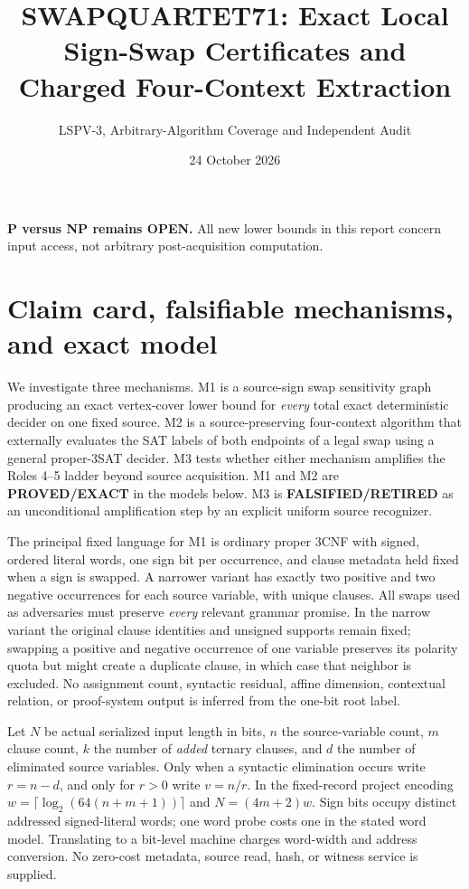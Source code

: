\documentclass[11pt]{article}
\title{SWAPQUARTET71: Exact Local Sign-Swap Certificates and Charged Four-Context Extraction}
\author{LSPV-3, Arbitrary-Algorithm Coverage and Independent Audit}
\date{24 October 2026}
\begin{document}
\maketitle
\begin{center}\textbf{P versus NP remains OPEN.} All new lower bounds in this report concern input access, not arbitrary post-acquisition computation.\end{center}

\section{Claim card, falsifiable mechanisms, and exact model}
We investigate three mechanisms. M1 is a source-sign swap sensitivity graph producing an exact vertex-cover lower bound for \emph{every} total exact deterministic decider on one fixed source. M2 is a source-preserving four-context algorithm that externally evaluates the SAT labels of both endpoints of a legal swap using a general proper-3SAT decider. M3 tests whether either mechanism amplifies the Roles 4--5 ladder beyond source acquisition. M1 and M2 are \textbf{PROVED/EXACT} in the models below. M3 is \textbf{FALSIFIED/RETIRED} as an unconditional amplification step by an explicit uniform source recognizer.

The principal fixed language for M1 is ordinary proper 3CNF with signed, ordered literal words, one sign bit per occurrence, and clause metadata held fixed when a sign is swapped. A narrower variant has exactly two positive and two negative occurrences for each source variable, with unique clauses. All swaps used as adversaries must preserve \emph{every} relevant grammar promise. In the narrow variant the original clause identities and unsigned supports remain fixed; swapping a positive and negative occurrence of one variable preserves its polarity quota but might create a duplicate clause, in which case that neighbor is excluded. No assignment count, syntactic residual, affine dimension, contextual relation, or proof-system output is inferred from the one-bit root label.

Let $N$ be actual serialized input length in bits, $n$ the source-variable count, $m$ clause count, $k$ the number of \emph{added} ternary clauses, and $d$ the number of eliminated source variables. Only when a syntactic elimination occurs write $r=n-d$, and only for $r>0$ write $v=n/r$. In the fixed-record project encoding $w=\lceil\log_2(64(n+m+1))\rceil$ and $N=(4m+2)w$. Sign bits occupy distinct addressed signed-literal words; one word probe costs one in the stated word model. Translating to a bit-level machine charges word-width and address conversion. No zero-cost metadata, source read, hash, or witness service is supplied.
\end{document}
